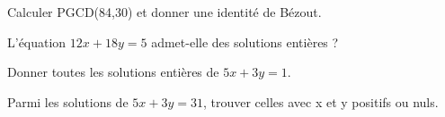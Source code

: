 \documentclass[11pt]{article}
\begin{document}
Calculer PGCD(84,30) et donner une identité de Bézout.\par
\vspace{5pt}
L’équation \(12x + 18y = 5\) admet-elle des solutions entières ?\par
\vspace{5pt}
Donner toutes les solutions entières de \(5x + 3y = 1\).\par
\vspace{5pt}
Parmi les solutions de \(5x + 3y = 31\), trouver celles avec x et y positifs ou nuls.\par
\vspace{5pt}
\end{document}
